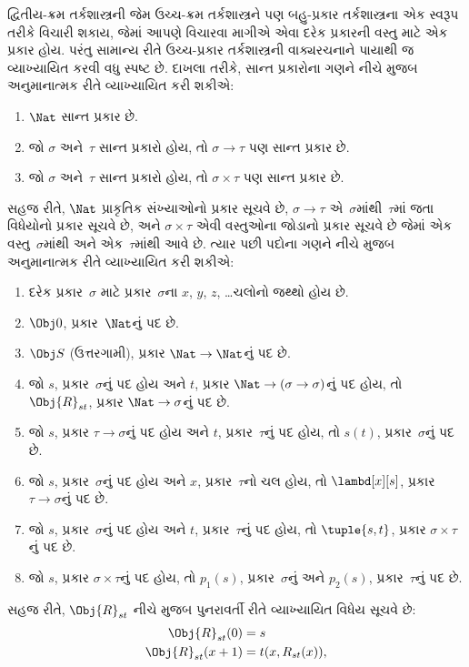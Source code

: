 \documentclass[../../../include/open-logic-section]{subfiles}
\begin{document}
દ્વિતીય-ક્રમ તર્કશાસ્ત્રની જેમ ઉચ્ચ-ક્રમ તર્કશાસ્ત્રને પણ બહુ-પ્રકાર
તર્કશાસ્ત્રના એક સ્વરૂપ તરીકે વિચારી શકાય, જેમાં આપણે વિચારવા માગીએ
એવા દરેક પ્રકારની વસ્તુ માટે એક પ્રકાર હોય. પરંતુ સામાન્ય રીતે
ઉચ્ચ-પ્રકાર તર્કશાસ્ત્રની વાક્યરચનાને પાયાથી જ વ્યાખ્યાયિત કરવી વધુ
સ્પષ્ટ છે. દાખલા તરીકે, સાન્ત પ્રકારોના ગણને નીચે મુજબ અનુમાનાત્મક રીતે
વ્યાખ્યાયિત કરી શકીએ:
\begin{enumerate}
\item $\Nat$ સાન્ત પ્રકાર છે.
\item જો $\sigma$ અને~$\tau$ સાન્ત પ્રકારો હોય, તો $\sigma
  \to \tau$ પણ સાન્ત પ્રકાર છે.
\item જો $\sigma$ અને~$\tau$ સાન્ત પ્રકારો હોય, તો $\sigma \times
  \tau$ પણ સાન્ત પ્રકાર છે.
\end{enumerate}
સહજ રીતે, $\Nat$ પ્રાકૃતિક સંખ્યાઓનો પ્રકાર સૂચવે છે,
$\sigma \to \tau$ એ~$\sigma$માંથી~$\tau$માં જતા વિધેયોનો પ્રકાર
સૂચવે છે, અને $\sigma \times \tau$ એવી વસ્તુઓના જોડાનો પ્રકાર સૂચવે
છે જેમાં એક વસ્તુ~$\sigma$માંથી અને એક~$\tau$માંથી આવે છે. ત્યાર પછી
પદોના ગણને નીચે મુજબ અનુમાનાત્મક રીતે વ્યાખ્યાયિત કરી શકીએ:
\begin{enumerate}
\item દરેક પ્રકાર~$\sigma$ માટે પ્રકાર~$\sigma$ના $x$, $y$, $z$, \dots ચલોનો
  જથ્થો હોય છે.
\item $\Obj 0$, પ્રકાર~$\Nat$નું પદ છે.
\item $\Obj S$ (ઉત્તરગામી), પ્રકાર $\Nat \to \Nat$નું પદ છે.
\item જો $s$, પ્રકાર~$\sigma$નું પદ હોય અને $t$, પ્રકાર
  $\Nat \to (\sigma \to \sigma)$નું પદ હોય, તો $\Obj{R}_{st}$,
  પ્રકાર $\Nat \to \sigma$નું પદ છે.
\item જો $s$, પ્રકાર $\tau \to \sigma$નું પદ હોય અને $t$,
  પ્રકાર~$\tau$નું પદ હોય, તો $s(t)$, પ્રકાર~$\sigma$નું પદ છે.
\item જો $s$, પ્રકાર~$\sigma$નું પદ હોય અને $x$, પ્રકાર~$\tau$નો ચલ
  હોય, તો $\lambd[x][s]$, પ્રકાર $\tau \to \sigma$નું પદ છે.
\item જો $s$, પ્રકાર~$\sigma$નું પદ હોય અને $t$, પ્રકાર~$\tau$નું પદ
  હોય, તો $\tuple{s, t}$, પ્રકાર $\sigma \times \tau$નું પદ છે.
\item જો $s$, પ્રકાર $\sigma \times \tau$નું પદ હોય, તો $p_1(s)$,
  પ્રકાર~$\sigma$નું અને $p_2(s)$, પ્રકાર~$\tau$નું પદ છે.
\end{enumerate}
સહજ રીતે, $\Obj{R}_{st}$ નીચે મુજબ પુનરાવર્તી રીતે વ્યાખ્યાયિત વિધેય
સૂચવે છે:
\begin{align*}
\Obj{R}_{st}(0) & = s \\
\Obj{R}_{st}(x+1) & = t(x, R_{st}(x)),
\end{align*}
\end{document}
